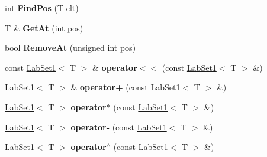 \begin{DoxyCompactItemize}
\item 
\hypertarget{classelps_1_1_lab_set1_afef2b2ba8157540f4308226054863913}{int {\bfseries Find\-Pos} (T elt)}\label{classelps_1_1_lab_set1_afef2b2ba8157540f4308226054863913}

\item 
\hypertarget{classelps_1_1_lab_set1_a5757cfe7e367a9abeb16cf1055ca7fee}{T \& {\bfseries Get\-At} (int pos)}\label{classelps_1_1_lab_set1_a5757cfe7e367a9abeb16cf1055ca7fee}

\item 
\hypertarget{classelps_1_1_lab_set1_ae8cc5a4eac6599c8374c8fbc97027f33}{bool {\bfseries Remove\-At} (unsigned int pos)}\label{classelps_1_1_lab_set1_ae8cc5a4eac6599c8374c8fbc97027f33}

\item 
\hypertarget{classelps_1_1_lab_set1_a4200ac9d614a09674ee15258ce995864}{const \hyperlink{classelps_1_1_lab_set1}{Lab\-Set1}$<$ T $>$ \& {\bfseries operator$<$$<$} (const \hyperlink{classelps_1_1_lab_set1}{Lab\-Set1}$<$ T $>$ \&)}\label{classelps_1_1_lab_set1_a4200ac9d614a09674ee15258ce995864}

\item 
\hypertarget{classelps_1_1_lab_set1_ab0f93815f027d90c2c34497ab407bfe1}{\hyperlink{classelps_1_1_lab_set1}{Lab\-Set1}$<$ T $>$ \& {\bfseries operator+} (const \hyperlink{classelps_1_1_lab_set1}{Lab\-Set1}$<$ T $>$ \&)}\label{classelps_1_1_lab_set1_ab0f93815f027d90c2c34497ab407bfe1}

\item 
\hypertarget{classelps_1_1_lab_set1_a6e3f33c756193d7f09ba46e2493df7b7}{\hyperlink{classelps_1_1_lab_set1}{Lab\-Set1}$<$ T $>$ {\bfseries operator$\ast$} (const \hyperlink{classelps_1_1_lab_set1}{Lab\-Set1}$<$ T $>$ \&)}\label{classelps_1_1_lab_set1_a6e3f33c756193d7f09ba46e2493df7b7}

\item 
\hypertarget{classelps_1_1_lab_set1_ae4287f8b612e0bb18efac72dbeb23b40}{\hyperlink{classelps_1_1_lab_set1}{Lab\-Set1}$<$ T $>$ {\bfseries operator-\/} (const \hyperlink{classelps_1_1_lab_set1}{Lab\-Set1}$<$ T $>$ \&)}\label{classelps_1_1_lab_set1_ae4287f8b612e0bb18efac72dbeb23b40}

\item 
\hypertarget{classelps_1_1_lab_set1_a2214858a2b61d690631d95a3c6d87c3d}{\hyperlink{classelps_1_1_lab_set1}{Lab\-Set1}$<$ T $>$ {\bfseries operator$^\wedge$} (const \hyperlink{classelps_1_1_lab_set1}{Lab\-Set1}$<$ T $>$ \&)}\label{classelps_1_1_lab_set1_a2214858a2b61d690631d95a3c6d87c3d}

\end{DoxyCompactItemize}
